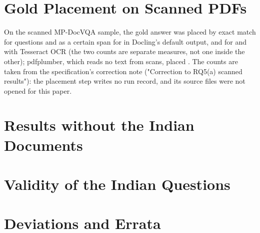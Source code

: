 \FloatBarrier
\section{Gold Placement on Scanned PDFs}
\label{app:scanned}

On the scanned MP-DocVQA sample, the gold answer was placed by exact match for
\ManualScannedPlacementDoclingExact{} questions and as a certain span for \ManualScannedPlacementDoclingCertain{} in
Docling's default output, and for \ManualScannedPlacementTesseractExact{} and \ManualScannedPlacementTesseractCertain{}
with Tesseract OCR (the two counts are separate measures, not one inside the other); pdfplumber, which reads no text
from scans, placed \ManualScannedPlacementPdfplumber{}. The counts are taken from the specification's correction note
("Correction to RQ5(a) scanned results"): the placement step writes no run record, and its source files were not opened for this paper.

\FloatBarrier
\section{Results without the Indian Documents}
\label{app:no-indian}
\begin{table}[!htb]
\centering
{}
\caption{Per-document choice with and without the Indian documents.}
\label{tab:a6}
\end{table}

\FloatBarrier
\section{Validity of the Indian Questions}
\label{app:golden}
\begin{table}[!htb]
\centering
{}
\caption{Questions judged invalid in the first batch (Wilson 95\% intervals).}
\label{tab:a7}
\end{table}

\FloatBarrier
\section{Deviations and Errata}
\label{app:deviations}

\begin{table}[!htb]
\centering
{}
\caption{Deviations from the pre-registered plan, corrections and disclosures, each anchored to a dated note of the
specification.}
\label{tab:deviations}
\end{table}

